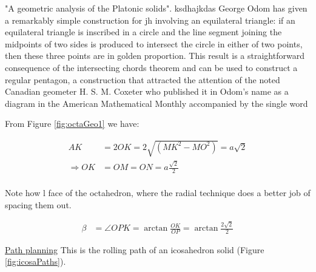   "A geometric analysis of the Platonic solids". ksdhajkdas
George Odom has given a remarkably simple construction for jh involving an equilateral triangle: if an equilateral triangle is inscribed in a circle and the line segment joining the midpoints of two sides is produced to intersect the circle in either of two points, then these three points are in golden proportion. This result is a straightforward consequence of the intersecting chords theorem and can be used to construct a regular pentagon, a construction that attracted the attention of the noted Canadian geometer H. S. M. Coxeter who published it in Odom's name as a diagram in the American Mathematical Monthly accompanied by the single word 

\noindent From Figure \ref{fig:octaGeo1} we have:

\begin{equation*} 
\label{octa:eq0}
\begin{split}
AK & = 2OK = 2\sqrt{(MK^2-MO^2)} = a\sqrt{2}\\
\Rightarrow OK & = OM = ON = a\frac{\sqrt{2}}{2}\\
\end{split}
\end{equation*}

\noindent Note how l face of the octahedron, where the radial technique does a better job of spacing them out. 

\begin{equation*} 
\label{octa:eq2}
\begin{split}
\beta & = \angle OPK = \arctan{\frac{OK}{OP}} = \arctan{\frac{2\sqrt{2}}{2}}
\end{split}
\end{equation*}

%
%
\noindent\uline{Path planning} 
This is the rolling path of an icosahedron solid (Figure \ref{fig:icosaPaths}).

